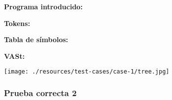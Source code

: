 \documentclass[11pt, , a4paper, titlepage]{article}
\newenvironment{changemargin}[2]{%
\begin{list}{}{%
\setlength{\topsep}{0pt}%
\setlength{\leftmargin}{#1}%
\setlength{\rightmargin}{#2}%
\setlength{\listparindent}{\parindent}%
\setlength{\itemindent}{\parindent}%
\setlength{\parsep}{\parskip}%
}%
\item[]}{\end{list}}
\begin{document}
\begin{changemargin}{+0.5cm}{+0cm}
    \vspace{1mm}

    \textbf{Programa introducido:}
    \begin{changemargin}{+0.5cm}{+0cm}
        
    \end{changemargin}

    \vspace{2mm}

    \textbf{Tokens:}
    \vspace{1mm}
    \begin{changemargin}{+0.5cm}{+0cm}
    \end{changemargin}

    \vspace{2mm}

    \textbf{Tabla de símbolos:}
    \vspace{1mm}
    \begin{changemargin}{+0.5cm}{+0cm}
    \end{changemargin}

    \vspace{2mm}
    \clearpage

    \textbf{VASt:}
    \vspace{1mm}
    \begin{center}
        \texttt{[image: ./resources/test-cases/case-1/tree.jpg]}
    \end{center}

\end{changemargin}
\clearpage

\subsubsection{Prueba correcta 2}
\end{document}

